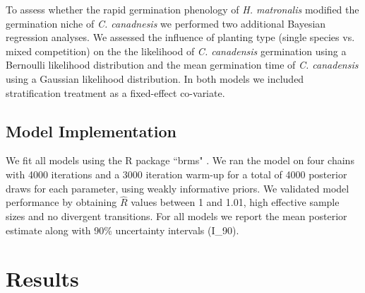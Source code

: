 \documentclass{article}[11pt]
\begin{document}
To assess whether the rapid germination phenology of \textit{H. matronalis} modified the germination niche of \textit{C. canadnesis} we performed two additional Bayesian regression analyses. We assessed the influence of planting type (single species vs. mixed competition) on the the likelihood of \textit{C. canadensis} germination using a Bernoulli likelihood distribution and the mean germination time of \textit{C. canadensis} using a Gaussian likelihood distribution. In both models we included stratification treatment as a fixed-effect co-variate.

\subsection*{Model Implementation}
\noindent We fit all models using the R package ``brms" \citep{Burkner2018}.  We ran the model on four chains with 4000 iterations and a 3000 iteration warm-up for a total of 4000 posterior draws for each parameter, using weakly informative priors. We validated model performance by obtaining $\hat{R}$ values between 1 and 1.01, high effective sample sizes and no divergent transitions. For all models we report the mean posterior estimate along with 90\% uncertainty intervals (I_{90}).

\section*{Results}
\end{document}
